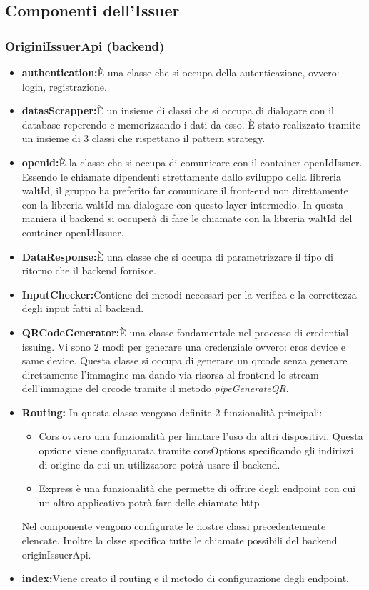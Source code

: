 \subsection{Componenti dell'\textbf{Issuer}}

\subsubsection{OriginiIssuerApi (backend)}
\begin{itemize}
    \item \textbf{authentication:}È una classe che si occupa della autenticazione, ovvero: login, registrazione. 
    \item \textbf{datasScrapper:}È un insieme di classi che si occupa di dialogare con il database reperendo e memorizzando i dati da esso. È stato realizzato tramite un insieme di 3 classi che rispettano il pattern strategy. 
    \item \textbf{openid:}È la classe che si occupa di comunicare con il container openIdIssuer. Essendo le chiamate dipendenti strettamente dallo sviluppo della libreria waltId, il gruppo ha preferito far comunicare il front-end non direttamente con la libreria waltId ma dialogare con questo layer intermedio. In questa maniera il backend si occuperà di fare le chiamate con la libreria waltId del container openIdIssuer.
    \item \textbf{DataResponse:}È una classe che si occupa di parametrizzare il tipo di ritorno che il backend fornisce.
    \item \textbf{InputChecker:}Contiene dei metodi necessari per la verifica e la correttezza degli input fatti al backend.
    \item \textbf{QRCodeGenerator:}È una classe fondamentale nel processo di credential issuing. Vi sono 2 modi per generare una credenziale ovvero: cros device e same device. Questa classe si occupa di generare un qrcode senza generare direttamente l'immagine ma dando via risorsa al frontend lo stream dell'immagine del qrcode tramite il metodo \textit{pipeGenerateQR}.
    \item \textbf{Routing:} In questa classe vengono definite 2 funzionalità principali:
     \begin{itemize}
     \item Cors ovvero una funzionalità per limitare l'uso da altri dispositivi. Questa opzione viene configuarata tramite corsOptions specificando gli indirizzi di origine da cui un utilizzatore potrà usare il backend. 
     \item Express è una funzionalità che permette di offrire degli endpoint con cui un altro applicativo potrà fare delle chiamate http. 
     \end{itemize}
    Nel componente vengono configurate le nostre classi precedentemente elencate.
    Inoltre la clsse specifica tutte le chiamate possibili del backend originIssuerApi.
    \item \textbf{index:}Viene creato il routing e il metodo di configurazione degli endpoint.
\end{itemize}

